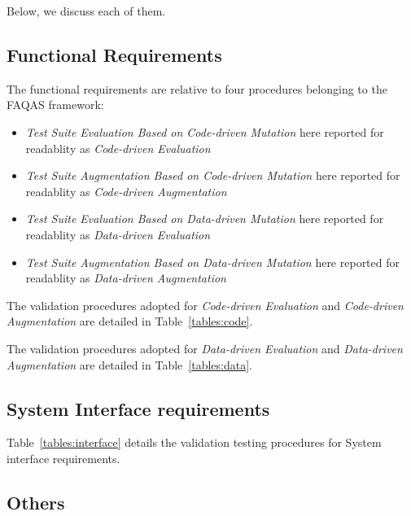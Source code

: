 Below, we discuss each of them. 

\subsection{Functional Requirements}

The functional requirements are relative to four procedures belonging to the FAQAS framework:
\begin{itemize}
  \item \emph{Test Suite Evaluation Based on Code-driven Mutation} here reported for readablity as \emph{Code-driven Evaluation}
  \item \emph{Test Suite Augmentation Based on Code-driven Mutation} here reported for readablity as \emph{Code-driven Augmentation}
  \item \emph{Test Suite Evaluation Based on Data-driven Mutation} here reported for readablity as \emph{Data-driven Evaluation}
  \item \emph{Test Suite Augmentation Based on Data-driven Mutation} here reported for readablity as \emph{Data-driven Augmentation}
\end{itemize}

The validation procedures adopted for \emph{Code-driven Evaluation} and \emph{Code-driven Augmentation} are detailed in Table~\ref{tables:code}.



The validation procedures adopted for \emph{Data-driven Evaluation} and \emph{Data-driven Augmentation} are detailed in Table~\ref{tables:data}.




\clearpage

\subsection{System Interface requirements}

Table~\ref{tables:interface} details the validation testing procedures for System interface requirements.



\subsection{Others}

